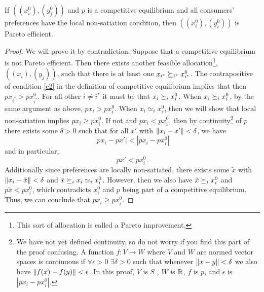 \begin{theorem}
  If $((x_i^0),(y^0_j))$ and $p$ is a competitive equilibrium and all
  consumers' preferences have the local non-satiation condition, then
  $((x^0_i),(y^0_i))$ is Pareto efficient.
\end{theorem}
\begin{proof}
  We will prove it by contradiction. Suppose that a competitive
  equilibrium is not Pareto efficient. Then there exists another
  feasible allocation\footnote{This sort of allocation is called a
    Pareto improvement.}, $((x_i),(y_j))$, such that there is at least
  one $x_{i^*} \succeq_{i^*} x_{i^*}^0$. The contrapositive of condition
  \ref{c2} in the definition of competitive equilibrium implies that
  then $p x_{i^*} > p x_{i^*}^0$.  For all other $i \neq i^*$ it must
  be that $x_i \succeq_i x_i^0$. When $x_i \succeq_i x_i^0$, by the same
  argument as above, $p x_i > p x_i^0$. When $x_i \simeq_i x_i^0$,
  then we will show that local non-satiation implies $px_i \geq
  px_i^0$. If not and $px_i < p x_i^0$, then by continuity\footnote{We
    have not yet defined continuity, so do not worry if you find this
    part of the proof confusing. A function $f: V\rightarrow W$ where
    $V$ and $W$ are normed vector spaces is continuous if $\forall
    \epsilon > 0$ $\exists \delta > 0$ such that whenever $\left\Vert {x -
      y} \right\Vert<\delta$ we also have $\left\Vert {f(x) - f(y)} \right\Vert < \epsilon$. In this
    proof, $V$ is $S$ , $W$ is $\mathbb{R}$, $f$ is $p$, and $\epsilon$ is
    $|px_i - px_i^0|$. } of $p$ there exists some $\delta > 0$ such
  that for all $x'$ with $\left\Vert {x_i - x'} \right\Vert < \delta$, we have
  \[ | p x_i - p x' | < | px_i - p x_i^0| \]
  and in particular, 
  \[ p x' < px_i^0. \]
  Additionally since preferences are locally non-satiated, there
  exists some $\tilde{x}$ with $\left\Vert {x_i - \tilde{x}} \right\Vert<\delta$ and
  $\tilde{x} \succeq_i x_i \simeq_i x_i^0$. However, then we also have
  $\tilde{x} \succeq_i x_i^0$ and $p \tilde{x} < p x_i^0$, which contradicts
  $x_i^0$  and $p$ being part of a competitive equilibrium. Thus, we
  can conclude that $p x_i \geq p x_i^0$.


\end{proof}
